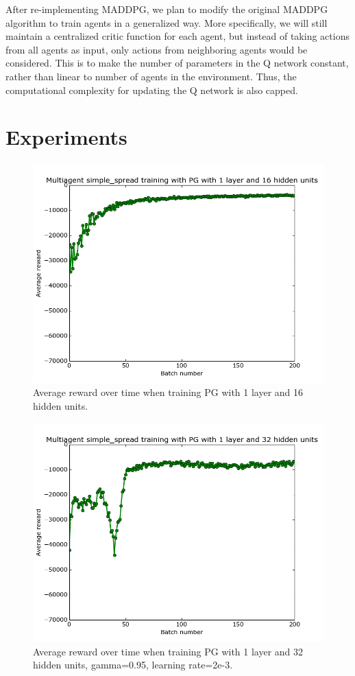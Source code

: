 \documentclass{article}
\begin{document}
After re-implementing MADDPG, we plan to modify the original MADDPG algorithm to train agents in a generalized way. More specifically, we will still maintain a centralized critic function for each agent, but instead of taking actions from all agents as input, only actions from neighboring agents would be considered. This is to make the number of parameters in the Q network constant, rather than linear to number of agents in the environment. Thus, the computational complexity for updating the Q network is also capped.

\section{Experiments}

\begin{figure}
\centering
    \includegraphics[scale=0.25]{pg_1_16_gamma1}
    \caption{Average reward over time when training PG with 1 layer and 16 hidden units.}
\label{fig:pg_1_16_gamma1}
\end{figure}

\begin{figure}
\centering
    \includegraphics[scale=0.25]{pg_1_32_gamma95}
    \caption{Average reward over time when training PG with 1 layer and 32 hidden units, gamma=0.95, learning rate=2e-3.}
\label{fig:pg_1_32_gamma95}
\end{figure}
\end{document}
